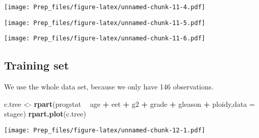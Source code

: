 \documentclass[]{article}
\newenvironment{Shaded}{\begin{snugshade}}{\end{snugshade}}
\newcommand{\DataTypeTok}[1]{\textcolor[rgb]{0.13,0.29,0.53}{#1}}
\newcommand{\KeywordTok}[1]{\textcolor[rgb]{0.13,0.29,0.53}{\textbf{#1}}}
\newcommand{\NormalTok}[1]{#1}
\newcommand{\OperatorTok}[1]{\textcolor[rgb]{0.81,0.36,0.00}{\textbf{#1}}}
\newcommand{\OtherTok}[1]{\textcolor[rgb]{0.56,0.35,0.01}{#1}}
\newcommand{\StringTok}[1]{\textcolor[rgb]{0.31,0.60,0.02}{#1}}
\begin{document}
\texttt{[image: Prep\_files/figure-latex/unnamed-chunk-11-4.pdf]}

\begin{Shaded}
\end{Shaded}

\texttt{[image: Prep\_files/figure-latex/unnamed-chunk-11-5.pdf]}

\begin{Shaded}
\end{Shaded}

\texttt{[image: Prep\_files/figure-latex/unnamed-chunk-11-6.pdf]}

\hypertarget{training-set}{%
\subsection{Training set}\label{training-set}}

We use the whole data set, because we only have 146 observations.

\begin{Shaded}
\begin{Highlighting}[]
\NormalTok{c.tree <-}\StringTok{ }\KeywordTok{rpart}\NormalTok{(progstat }\OperatorTok{~}\StringTok{ }\NormalTok{age }\OperatorTok{+}\StringTok{ }\NormalTok{eet }\OperatorTok{+}\StringTok{ }\NormalTok{g2 }\OperatorTok{+}\StringTok{ }\NormalTok{grade }\OperatorTok{+}\StringTok{ }\NormalTok{gleason }\OperatorTok{+}\StringTok{ }\NormalTok{ploidy,}\DataTypeTok{data =}\NormalTok{ stagec)}
\KeywordTok{rpart.plot}\NormalTok{(c.tree)}
\end{Highlighting}
\end{Shaded}

\texttt{[image: Prep\_files/figure-latex/unnamed-chunk-12-1.pdf]}
\end{document}
